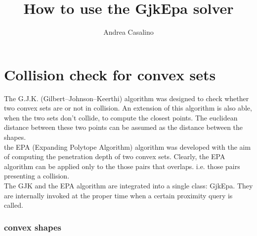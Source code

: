 \documentclass{article}
\author{Andrea Casalino}
\title{How to use the GjkEpa solver}
\begin{document}
\maketitle

\newpage
\section{Collision check for convex sets}

The G.J.K. (Gilbert–Johnson–Keerthi) algorithm was designed to check whether two convex sets are or not in collision.
An extension of this algorithm is also able, when the two sets don't collide, to compute the closest points. The euclidean distance between these two points can be assumed as the distance between the shapes.
\\
the EPA (Expanding Polytope Algorithm) algorithm was developed with the aim of computing the penetration depth of two convex sets. Clearly, the EPA algorithm can be applied only to the those pairs that overlaps. i.e. those pairs presenting a collision. 
\\
The GJK and the EPA algorithm are integrated into a single class: GjkEpa. They are internally invoked at the proper time when a certain proximity query is called.

\subsubsection{convex shapes}
\label{Sec:shapes_cnvx}
\end{document}
